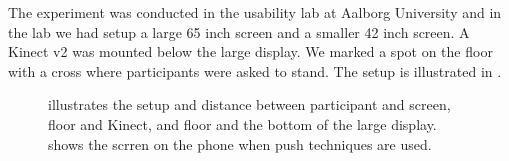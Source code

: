 The experiment was conducted in the usability lab at Aalborg University and in the lab we had setup a large 65 inch screen and a smaller 42 inch screen. 
A Kinect v2 was mounted below the large display.
We marked a spot on the floor with a cross where participants were asked to stand.
The setup is illustrated in .

\begin{figure}[H]
\caption{\protect{} illustrates the setup and distance between participant and screen, floor and Kinect, and floor and the bottom of the large display.\protect{} shows the scrren on the phone when push techniques are used.}
\end{figure}